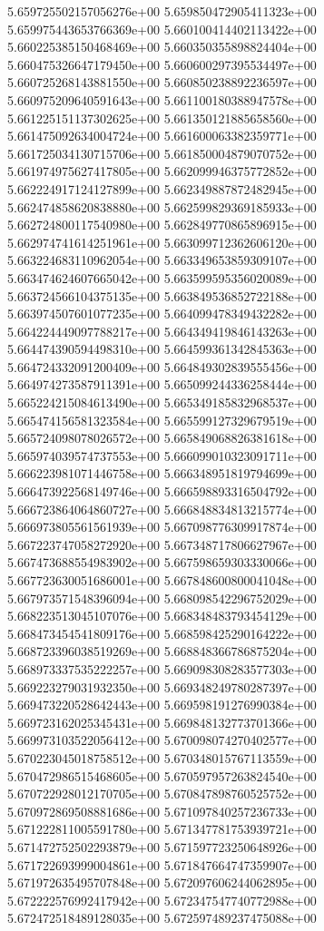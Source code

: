 5.659725502157056276e+00
5.659850472905411323e+00
5.659975443653766369e+00
5.660100414402113422e+00
5.660225385150468469e+00
5.660350355898824404e+00
5.660475326647179450e+00
5.660600297395534497e+00
5.660725268143881550e+00
5.660850238892236597e+00
5.660975209640591643e+00
5.661100180388947578e+00
5.661225151137302625e+00
5.661350121885658560e+00
5.661475092634004724e+00
5.661600063382359771e+00
5.661725034130715706e+00
5.661850004879070752e+00
5.661974975627417805e+00
5.662099946375772852e+00
5.662224917124127899e+00
5.662349887872482945e+00
5.662474858620838880e+00
5.662599829369185933e+00
5.662724800117540980e+00
5.662849770865896915e+00
5.662974741614251961e+00
5.663099712362606120e+00
5.663224683110962054e+00
5.663349653859309107e+00
5.663474624607665042e+00
5.663599595356020089e+00
5.663724566104375135e+00
5.663849536852722188e+00
5.663974507601077235e+00
5.664099478349432282e+00
5.664224449097788217e+00
5.664349419846143263e+00
5.664474390594498310e+00
5.664599361342845363e+00
5.664724332091200409e+00
5.664849302839555456e+00
5.664974273587911391e+00
5.665099244336258444e+00
5.665224215084613490e+00
5.665349185832968537e+00
5.665474156581323584e+00
5.665599127329679519e+00
5.665724098078026572e+00
5.665849068826381618e+00
5.665974039574737553e+00
5.666099010323091711e+00
5.666223981071446758e+00
5.666348951819794699e+00
5.666473922568149746e+00
5.666598893316504792e+00
5.666723864064860727e+00
5.666848834813215774e+00
5.666973805561561939e+00
5.667098776309917874e+00
5.667223747058272920e+00
5.667348717806627967e+00
5.667473688554983902e+00
5.667598659303330066e+00
5.667723630051686001e+00
5.667848600800041048e+00
5.667973571548396094e+00
5.668098542296752029e+00
5.668223513045107076e+00
5.668348483793454129e+00
5.668473454541809176e+00
5.668598425290164222e+00
5.668723396038519269e+00
5.668848366786875204e+00
5.668973337535222257e+00
5.669098308283577303e+00
5.669223279031932350e+00
5.669348249780287397e+00
5.669473220528642443e+00
5.669598191276990384e+00
5.669723162025345431e+00
5.669848132773701366e+00
5.669973103522056412e+00
5.670098074270402577e+00
5.670223045018758512e+00
5.670348015767113559e+00
5.670472986515468605e+00
5.670597957263824540e+00
5.670722928012170705e+00
5.670847898760525752e+00
5.670972869508881686e+00
5.671097840257236733e+00
5.671222811005591780e+00
5.671347781753939721e+00
5.671472752502293879e+00
5.671597723250648926e+00
5.671722693999004861e+00
5.671847664747359907e+00
5.671972635495707848e+00
5.672097606244062895e+00
5.672222576992417942e+00
5.672347547740772988e+00
5.672472518489128035e+00
5.672597489237475088e+00
